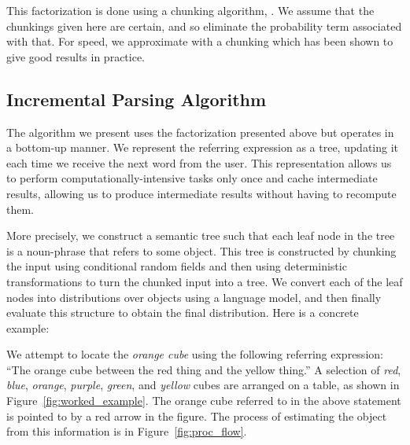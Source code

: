 \documentclass[conference]{IEEEtran}
\numberwithin{equation}{section}
\begin{document}
This factorization is done using a chunking algorithm, \citep{McCallumMALLET}. We assume that the chunkings given here are certain, and so eliminate the probability term associated with that. For speed, we approximate with a chunking which has been shown to give good results in practice.

\subsection{Incremental Parsing Algorithm}

The algorithm we present uses the factorization presented above but operates in a bottom-up manner. We represent the referring expression as a tree, updating it each time we receive the next word from the user. This representation allows us to perform computationally-intensive tasks only once and cache intermediate results, allowing us to produce intermediate results without having to recompute them.

More precisely, we construct a semantic tree such that each leaf node in the tree is a noun-phrase that refers to some object. This tree is constructed by chunking the input using conditional random fields and then using deterministic transformations to turn the chunked input into a tree. We convert each of the leaf nodes into distributions over objects using a language model, and then finally evaluate this structure to obtain the final distribution. Here is a concrete example: 

We attempt to locate the \textit{orange cube} using the following referring expression: ``The orange cube between the red thing and the yellow thing.'' A selection of \textit{red}, \textit{blue}, \textit{orange}, \textit{purple}, \textit{green}, and  \textit{yellow} cubes are arranged on a table, as shown in Figure~\ref{fig:worked_example}. The orange cube referred to in the above statement is pointed to by a red arrow in the figure. The process of estimating the object from this information is in Figure~\ref{fig:proc_flow}.
\end{document}
